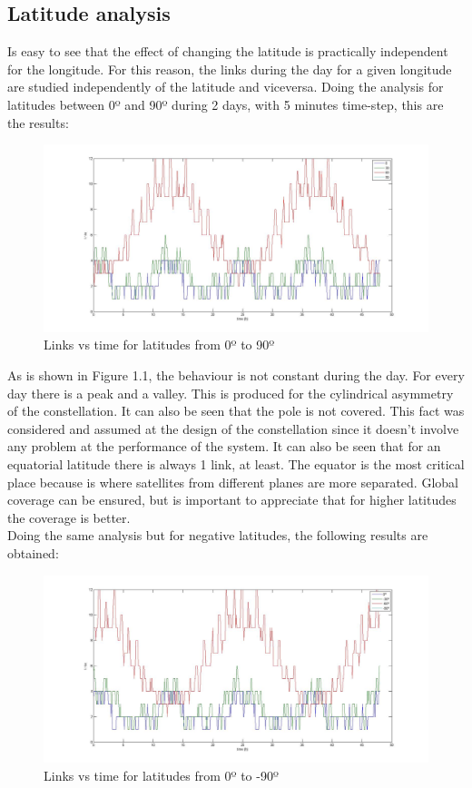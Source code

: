 \subsection{Latitude analysis}
Is easy to see that the effect of changing the latitude is practically independent for the longitude. For this reason, the links during the day for a given longitude are studied independently of the latitude and viceversa. Doing the analysis for latitudes between 0º and 90º during 2 days, with 5 minutes time-step, this are the results:

\begin{figure}[H]
\begin{center}
\includegraphics[scale=0.30]{0_30_90_lat.jpg}
\caption{Links vs time for latitudes from 0º to 90º}
\end{center}
\end{figure}
As is shown in Figure 1.1, the behaviour is not constant during the day. For every day there is a peak and a valley. This is produced for the cylindrical asymmetry of the constellation. It can also be seen that the pole is not covered. This fact was considered and assumed at the design of the constellation since it doesn't involve any problem at the performance of the system. It can also be seen that for an equatorial latitude there is always 1 link, at least. The equator is the most critical place because is where satellites from different planes are more separated. Global coverage can be ensured, but is important to appreciate that for higher latitudes the coverage is better.\\
Doing the same analysis but for negative latitudes, the following results are obtained:
\begin{figure}[H]
\begin{center}
\includegraphics[scale=0.30]{0_-30_-90_lat.jpg}
\caption{Links vs time for latitudes from 0º to -90º}
\end{center}
\end{figure}
